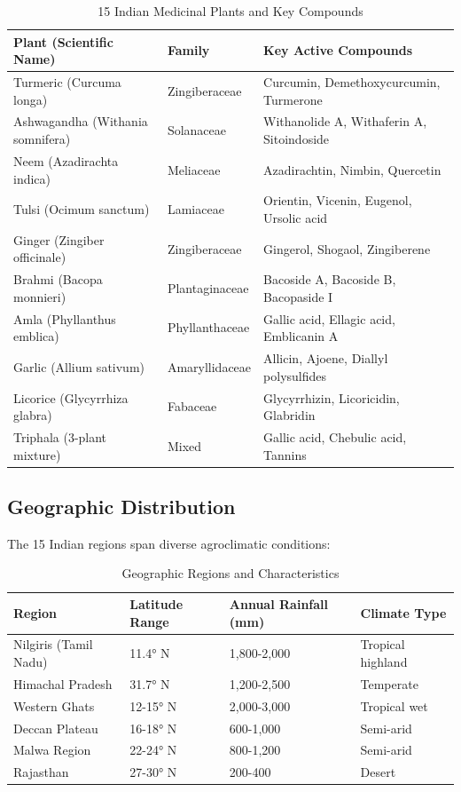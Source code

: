 \documentclass[11pt,a4paper]{article}
\begin{document}
\begin{table}[H]
\centering
\caption{15 Indian Medicinal Plants and Key Compounds}
\label{tab:plants}
\small
\begin{tabular}{|l|l|l|}
\hline
\textbf{Plant (Scientific Name)} & \textbf{Family} & \textbf{Key Active Compounds} \\
\hline
Turmeric (Curcuma longa) & Zingiberaceae & Curcumin, Demethoxycurcumin, Turmerone \\
\hline
Ashwagandha (Withania somnifera) & Solanaceae & Withanolide A, Withaferin A, Sitoindoside \\
\hline
Neem (Azadirachta indica) & Meliaceae & Azadirachtin, Nimbin, Quercetin \\
\hline
Tulsi (Ocimum sanctum) & Lamiaceae & Orientin, Vicenin, Eugenol, Ursolic acid \\
\hline
Ginger (Zingiber officinale) & Zingiberaceae & Gingerol, Shogaol, Zingiberene \\
\hline
Brahmi (Bacopa monnieri) & Plantaginaceae & Bacoside A, Bacoside B, Bacopaside I \\
\hline
Amla (Phyllanthus emblica) & Phyllanthaceae & Gallic acid, Ellagic acid, Emblicanin A \\
\hline
Garlic (Allium sativum) & Amaryllidaceae & Allicin, Ajoene, Diallyl polysulfides \\
\hline
Licorice (Glycyrrhiza glabra) & Fabaceae & Glycyrrhizin, Licoricidin, Glabridin \\
\hline
Triphala (3-plant mixture) & Mixed & Gallic acid, Chebulic acid, Tannins \\
\hline
\end{tabular}
\end{table}

\subsection{Geographic Distribution}

The 15 Indian regions span diverse agroclimatic conditions:

\begin{table}[H]
\centering
\caption{Geographic Regions and Characteristics}
\label{tab:regions}
\small
\begin{tabular}{|l|l|l|l|}
\hline
\textbf{Region} & \textbf{Latitude Range} & \textbf{Annual Rainfall (mm)} & \textbf{Climate Type} \\
\hline
Nilgiris (Tamil Nadu) & 11.4° N & 1,800-2,000 & Tropical highland \\
\hline
Himachal Pradesh & 31.7° N & 1,200-2,500 & Temperate \\
\hline
Western Ghats & 12-15° N & 2,000-3,000 & Tropical wet \\
\hline
Deccan Plateau & 16-18° N & 600-1,000 & Semi-arid \\
\hline
Malwa Region & 22-24° N & 800-1,200 & Semi-arid \\
\hline
Rajasthan & 27-30° N & 200-400 & Desert \\
\hline
\end{tabular}
\end{table}
\end{document}

